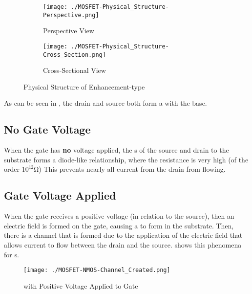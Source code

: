 \begin{figure}[h!tbp]
  \centering
  \begin{subfigure}[h!tbp]{0.48\linewidth}
    \centering
    \texttt{[image: ./MOSFET-Physical\_Structure-Perspective.png]}
    \caption{Perspective View \parencite[p.~249]{sedraTextbook7}}
    \label{fig:MOSFET-Physical_Structure-Perspective}
  \end{subfigure}
  \begin{subfigure}[h!tbp]{0.48\linewidth}
    \centering
    \texttt{[image: ./MOSFET-Physical\_Structure-Cross\_Section.png]}
    \caption{Cross-Sectional View \parencite[p.~249]{sedraTextbook7}}
    \label{fig:MOSFET-Physical_Structure-Cross_Section}
  \end{subfigure}
  \caption{Physical Structure of Enhancement-type  }
  \label{fig:MOSFET-Physical_Structure}
\end{figure}

As can be seen in , the drain and source both form a \PNJunction{} with the base.

\subsection{No Gate Voltage}\label{subsec:MOSFET-No_Gate_Voltage}
When the gate has \textbf{no} voltage applied, the \PNJunction{}s of the source and drain to the substrate forms a diode-like relationship, where the resistance is very high (of the order $10^{12}\si{\ohm}$)
This prevents nearly all current from the drain from flowing.

\subsection{Gate Voltage Applied}\label{subsec:MOSFET-Gate_Voltage_Applied}
When the gate receives a positive voltage (in relation to the source), then an electric field is formed on the gate, causing a  to form in the substrate.
Then, there is a channel that is formed due to the application of the electric field that allows current to flow between the drain and the source.
 shows this phenomena for  s.

\begin{figure}[h!tbp]
  \centering
  \texttt{[image: ./MOSFET-NMOS-Channel\_Created.png]}
  \caption{  with Positive Voltage Applied to Gate \parencite[p.~251]{sedraTextbook7}}
  \label{fig:MOSFET-Gate_Voltage_Applied}
\end{figure}


